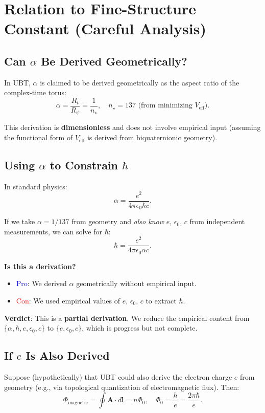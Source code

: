 \documentclass[12pt]{article}
\begin{document}
\section{Relation to Fine-Structure Constant (Careful Analysis)}

\subsection{Can $\alpha$ Be Derived Geometrically?}

In UBT, $\alpha$ is claimed to be derived geometrically as the aspect ratio of the complex-time torus:
\[
\alpha = \frac{R_t}{R_\psi} = \frac{1}{n_\star}, \quad n_\star = 137 \text{ (from minimizing } V_{\text{eff}}).
\]

This derivation is \textbf{dimensionless} and does not involve empirical input (assuming the functional form of $V_{\text{eff}}$ is derived from biquaternionic geometry).

\subsection{Using $\alpha$ to Constrain $\hbar$}

In standard physics:
\[
\alpha = \frac{e^2}{4\pi \epsilon_0 \hbar c}.
\]

If we take $\alpha = 1/137$ from geometry and \emph{also know} $e$, $\epsilon_0$, $c$ from independent measurements, we can solve for $\hbar$:
\[
\hbar = \frac{e^2}{4\pi \epsilon_0 \alpha c}.
\]

\textbf{Is this a derivation?}

\begin{itemize}
\item \textcolor{blue}{Pro}: We derived $\alpha$ geometrically without empirical input.
\item \textcolor{red}{Con}: We used empirical values of $e$, $\epsilon_0$, $c$ to extract $\hbar$.
\end{itemize}

\textbf{Verdict}: This is a \textbf{partial derivation}. We reduce the empirical content from $\{\alpha, \hbar, e, \epsilon_0, c\}$ to $\{e, \epsilon_0, c\}$, which is progress but not complete.

\subsection{If $e$ Is Also Derived}

Suppose (hypothetically) that UBT could also derive the electron charge $e$ from geometry (e.g., via topological quantization of electromagnetic flux). Then:
\[
\Phi_{\text{magnetic}} = \oint \mathbf{A} \cdot d\mathbf{l} = n \Phi_0, \quad \Phi_0 = \frac{h}{e} = \frac{2\pi\hbar}{e}.
\]
\end{document}

